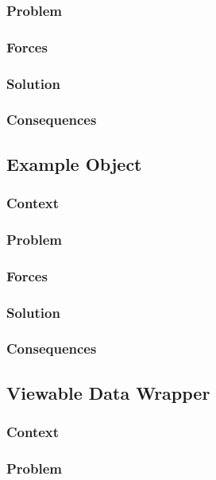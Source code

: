 \documentclass[sigconf]{acmart}
\begin{document}
\subsubsection*{Problem}
\subsubsection*{Forces}
\subsubsection*{Solution}
\subsubsection*{Consequences}

\subsection{Example Object}
\subsubsection*{Context}
\subsubsection*{Problem}
\subsubsection*{Forces}
\subsubsection*{Solution}
\subsubsection*{Consequences}

\subsection{Viewable Data Wrapper}
\subsubsection*{Context}
\subsubsection*{Problem}
\end{document}
